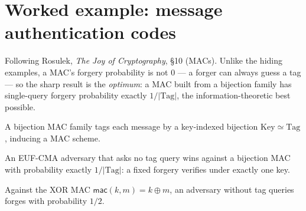 \chapter{Worked example: message authentication codes}

Following Rosulek, \emph{The Joy of Cryptography}, §10 (MACs). Unlike the hiding
examples, a MAC's forgery probability is not $0$ --- a forger can always guess a
tag --- so the sharp result is the \emph{optimum}: a MAC built from a bijection
family has single-query forgery probability exactly $1/|\mathrm{Tag}|$, the
information-theoretic best possible.

\begin{definition}
  \label{def:bijmac}
  \leanok
  A bijection MAC family tags each message by a key-indexed bijection
  $\mathrm{Key} \simeq \mathrm{Tag}$, inducing a MAC scheme.
\end{definition}

\begin{theorem}
  \label{thm:bijmac-forgery}
  \leanok
  An EUF-CMA adversary that asks no tag query wins against a bijection MAC with
  probability exactly $1/|\mathrm{Tag}|$: a fixed forgery verifies under exactly
  one key.
\end{theorem}

\begin{corollary}
  \label{cor:xormac}
  \leanok
  Against the XOR MAC $\mathsf{mac}(k, m) = k \oplus m$, an adversary without
  tag queries forges with probability $1/2$.
\end{corollary}
